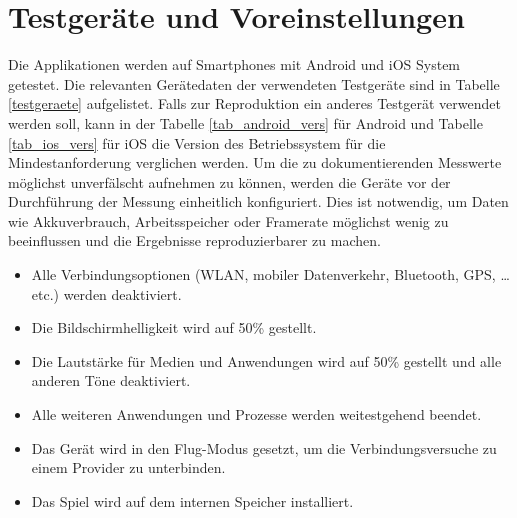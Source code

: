 \section{Testgeräte und Voreinstellungen}
Die Applikationen werden auf Smartphones mit Android und iOS System getestet. Die relevanten Gerätedaten der verwendeten Testgeräte sind in Tabelle \ref{testgeraete} aufgelistet. Falls zur Reproduktion ein anderes Testgerät verwendet werden soll, kann in der Tabelle \ref{tab_android_vers} für Android und Tabelle \ref{tab_ios_vers} für iOS die Version des Betriebssystem für die Mindestanforderung verglichen werden. Um die zu dokumentierenden Messwerte möglichst unverfälscht aufnehmen zu können, werden die Geräte vor der Durchführung der Messung einheitlich konfiguriert. Dies ist notwendig, um Daten wie Akkuverbrauch, Arbeitsspeicher oder Framerate möglichst wenig zu beeinflussen und die Ergebnisse reproduzierbarer zu machen. 

\begin{itemize}
	\item Alle Verbindungsoptionen (WLAN, mobiler Datenverkehr, Bluetooth, GPS, …etc.) werden deaktiviert.
	\item Die Bildschirmhelligkeit wird auf 50\% gestellt.
	\item Die Lautstärke für Medien und Anwendungen wird auf 50\% gestellt und alle anderen Töne deaktiviert.
	\item Alle weiteren Anwendungen und Prozesse werden weitestgehend beendet.
	\item Das Gerät wird in den Flug-Modus gesetzt, um die Verbindungsversuche zu einem Provider zu unterbinden.
	\item Das Spiel wird auf dem internen Speicher installiert.
\end{itemize}

